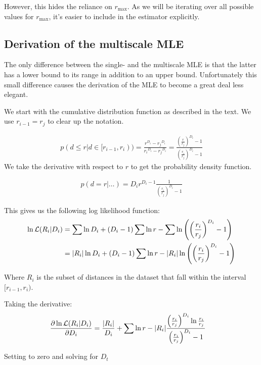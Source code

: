 \documentclass{article}
\begin{document}
However, this hides the reliance on $r_{\max}$. As we will be iterating over all possible values for $r_{\max}$, it's easier to include in the estimator explicitly.

\subsection{Derivation of the multiscale MLE}

The only difference between the single- and the multiscale MLE is that the latter has a lower bound to its range in addition to an upper bound. Unfortunately this small difference causes the derivation of the MLE to become a great deal less elegant.

We start with the cumulative distribution function as described in the text. We use $r_{i-1} = r_j$ to clear up the notation.

\begin{align*}
p(d \leq r | d \in [r_{i-1}, r_i)) = \frac{r^{D_i} - {r_{j}}^{D_i}}{{r_i}^{D_i} - {r_{j}}^{D_i}} = \frac{\left(\frac{r}{r_j}\right)^{D_i} - 1}{\left(\frac{r_i}{r_j}\right)^{D_i} - 1}
\end{align*}
We take the derivative with respect to $r$ to get the probability density function.

\begin{align*}
p(d = r | \ldots) = {D_i}r^{D_i-1} \frac{1}{\left(\frac{r_i}{r_j}\right)^{D_i} - 1}
\end{align*}

This gives us the following log likelihood function:
\begin{align*}
\ln{\cal L}(R_i|D_i) &= \sum \ln D_i + (D_i - 1)\sum \ln r - \sum \ln \left(\left(\frac{r_i}{r_j}\right)^{D_i} -1\right)\\
&=  |R_i|\ln D_i + (D_i - 1)\sum \ln r - |R_i| \ln \left(\left(\frac{r_i}{r_j}\right)^{D_i} -1\right) 
\end{align*}

Where $R_i$ is the subset of distances in the dataset that fall within the interval $[r_{i-1}, r_i)$. 

Taking the derivative:
\begin{align*}
\frac {\partial \ln{\cal L}(R_i|D_i)}{\partial D_i} &=  \frac{|R_i|}{D_i} + \sum \ln r - |R_i| \frac{\left(\frac{r_i}{r_j}\right)^{D_i} \ln \frac{r_i}{r_j}}{\left(\frac{r_i}{r_j}\right)^{D_i} -1}
\end{align*}

Setting to zero and solving for $D_t$
\end{document}
